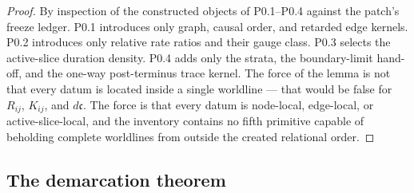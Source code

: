 \documentclass[11pt,a4paper]{article}
\theoremstyle{definition}
\theoremstyle{plain}
\theoremstyle{remark}
\begin{document}
\begin{proof}
By inspection of the constructed objects of P0.1--P0.4 against the patch's freeze ledger.
P0.1 introduces only graph, causal order, and retarded edge kernels. P0.2 introduces only
relative rate ratios and their gauge class. P0.3 selects the active-slice duration
density. P0.4 adds only the strata, the boundary-limit hand-off, and the one-way
post-terminus trace kernel. The force of the lemma is not that every datum is located
inside a single worldline --- that would be false for \(R_{ij}\), \(K_{ij}\), and
\(d\mathfrak c\). The force is that every datum is node-local, edge-local, or
active-slice-local, and the inventory contains no fifth primitive capable of beholding
complete worldlines from outside the created relational order. \qedhere
\end{proof}

\subsection{The demarcation theorem}
\end{document}
